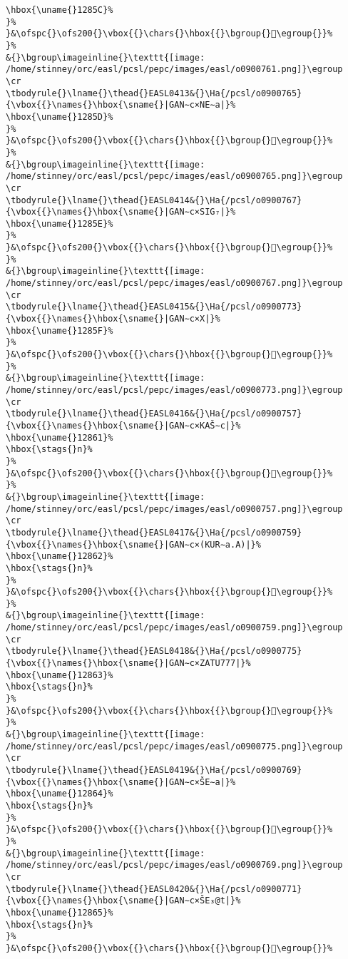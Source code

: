 \begin{verbatim}
\hbox{\uname{}1285C}%
}%
}&\ofspc{}\ofs200{}\vbox{{}\chars{}\hbox{{}\bgroup{}𒡜\egroup{}}%
}%
&{}\bgroup\imageinline{}\texttt{[image: /home/stinney/orc/easl/pcsl/pepc/images/easl/o0900761.png]}\egroup
\cr
\tbodyrule{}\lname{}\thead{}EASL0413&{}\Ha{/pcsl/o0900765}{\vbox{{}\names{}\hbox{\sname{}|GAN∼c×NE∼a|}%
\hbox{\uname{}1285D}%
}%
}&\ofspc{}\ofs200{}\vbox{{}\chars{}\hbox{{}\bgroup{}𒡝\egroup{}}%
}%
&{}\bgroup\imageinline{}\texttt{[image: /home/stinney/orc/easl/pcsl/pepc/images/easl/o0900765.png]}\egroup
\cr
\tbodyrule{}\lname{}\thead{}EASL0414&{}\Ha{/pcsl/o0900767}{\vbox{{}\names{}\hbox{\sname{}|GAN∼c×SIG₇|}%
\hbox{\uname{}1285E}%
}%
}&\ofspc{}\ofs200{}\vbox{{}\chars{}\hbox{{}\bgroup{}𒡞\egroup{}}%
}%
&{}\bgroup\imageinline{}\texttt{[image: /home/stinney/orc/easl/pcsl/pepc/images/easl/o0900767.png]}\egroup
\cr
\tbodyrule{}\lname{}\thead{}EASL0415&{}\Ha{/pcsl/o0900773}{\vbox{{}\names{}\hbox{\sname{}|GAN∼c×X|}%
\hbox{\uname{}1285F}%
}%
}&\ofspc{}\ofs200{}\vbox{{}\chars{}\hbox{{}\bgroup{}𒡟\egroup{}}%
}%
&{}\bgroup\imageinline{}\texttt{[image: /home/stinney/orc/easl/pcsl/pepc/images/easl/o0900773.png]}\egroup
\cr
\tbodyrule{}\lname{}\thead{}EASL0416&{}\Ha{/pcsl/o0900757}{\vbox{{}\names{}\hbox{\sname{}|GAN∼c×KAŠ∼c|}%
\hbox{\uname{}12861}%
\hbox{\stags{}n}%
}%
}&\ofspc{}\ofs200{}\vbox{{}\chars{}\hbox{{}\bgroup{}𒡡\egroup{}}%
}%
&{}\bgroup\imageinline{}\texttt{[image: /home/stinney/orc/easl/pcsl/pepc/images/easl/o0900757.png]}\egroup
\cr
\tbodyrule{}\lname{}\thead{}EASL0417&{}\Ha{/pcsl/o0900759}{\vbox{{}\names{}\hbox{\sname{}|GAN∼c×(KUR∼a.A)|}%
\hbox{\uname{}12862}%
\hbox{\stags{}n}%
}%
}&\ofspc{}\ofs200{}\vbox{{}\chars{}\hbox{{}\bgroup{}𒡢\egroup{}}%
}%
&{}\bgroup\imageinline{}\texttt{[image: /home/stinney/orc/easl/pcsl/pepc/images/easl/o0900759.png]}\egroup
\cr
\tbodyrule{}\lname{}\thead{}EASL0418&{}\Ha{/pcsl/o0900775}{\vbox{{}\names{}\hbox{\sname{}|GAN∼c×ZATU777|}%
\hbox{\uname{}12863}%
\hbox{\stags{}n}%
}%
}&\ofspc{}\ofs200{}\vbox{{}\chars{}\hbox{{}\bgroup{}𒡣\egroup{}}%
}%
&{}\bgroup\imageinline{}\texttt{[image: /home/stinney/orc/easl/pcsl/pepc/images/easl/o0900775.png]}\egroup
\cr
\tbodyrule{}\lname{}\thead{}EASL0419&{}\Ha{/pcsl/o0900769}{\vbox{{}\names{}\hbox{\sname{}|GAN∼c×ŠE∼a|}%
\hbox{\uname{}12864}%
\hbox{\stags{}n}%
}%
}&\ofspc{}\ofs200{}\vbox{{}\chars{}\hbox{{}\bgroup{}𒡤\egroup{}}%
}%
&{}\bgroup\imageinline{}\texttt{[image: /home/stinney/orc/easl/pcsl/pepc/images/easl/o0900769.png]}\egroup
\cr
\tbodyrule{}\lname{}\thead{}EASL0420&{}\Ha{/pcsl/o0900771}{\vbox{{}\names{}\hbox{\sname{}|GAN∼c×ŠE₃@t|}%
\hbox{\uname{}12865}%
\hbox{\stags{}n}%
}%
}&\ofspc{}\ofs200{}\vbox{{}\chars{}\hbox{{}\bgroup{}𒡥\egroup{}}%

\end{verbatim}

